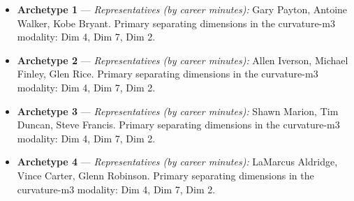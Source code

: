 \begin{itemize}
\item \textbf{Archetype 1} --- \emph{Representatives (by career minutes):} Gary Payton, Antoine Walker, Kobe Bryant. Primary separating dimensions in the curvature-m3 modality: Dim 4, Dim 7, Dim 2.
\item \textbf{Archetype 2} --- \emph{Representatives (by career minutes):} Allen Iverson, Michael Finley, Glen Rice. Primary separating dimensions in the curvature-m3 modality: Dim 4, Dim 7, Dim 2.
\item \textbf{Archetype 3} --- \emph{Representatives (by career minutes):} Shawn Marion, Tim Duncan, Steve Francis. Primary separating dimensions in the curvature-m3 modality: Dim 4, Dim 7, Dim 2.
\item \textbf{Archetype 4} --- \emph{Representatives (by career minutes):} LaMarcus Aldridge, Vince Carter, Glenn Robinson. Primary separating dimensions in the curvature-m3 modality: Dim 4, Dim 7, Dim 2.
\end{itemize}
